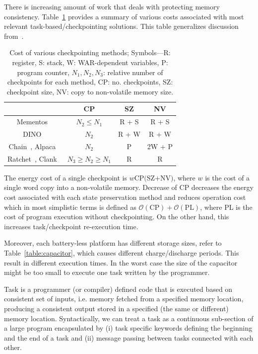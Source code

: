 There is increasing amount of work that deals with protecting memory consistency. Table~\ref{table:chechpoint_comparison} provides a summary of various costs associated with most relevant task-based/checkpointing solutions. This table generalizes discussion from~\cite[Sec. 2.4]{alpaca}.

\begin{table}
	\centering
	\begin{tabular}{|c|c|c|c|}
		\hline
		{~} & CP & SZ & NV \\
		\hline\hline
		\!\!Mementos~\cite{mementos}\!\! & \!\!$N_2\leq N_1$\!\! & \!\!R + S\!\! & \!\!R + S\!\! \\
		\!\!DINO~\cite{dino}\!\! & $N_2$\!\! & \!\!R + W\!\! & \!\!R + W\!\! \\
		\!\!Chain~\cite{chain}, Alpaca~\cite{alpaca}\!\! & \!\!$N_2$\!\! & P\!\! & \!\!2W + P\!\!\\
		\!\!Ratchet~\cite{ratchet}, Clank~\cite{hicks_isca_2017}\!\! & $N_3\geq N_2\geq N_1$\!\! & \!\!R\!\! & R\!\!\\
		\hline 
	\end{tabular}
	\caption{Cost of various checkpointing methods; Symbols---R: register, S: stack, W: WAR-dependent variables, P: program counter, $N_1, N_2, N_3$: relative number of checkpoints for each method, CP: no. checkpoints, SZ: checkpoint size, NV: copy to non-volatile memory size.}
	\label{table:chechpoint_comparison}
\end{table}

The energy cost of a single checkpoint is $w\text{CP(SZ+NV)}$, where $w$ is the cost of a single word copy into a non-volatile memory. Decrease of CP decreases the energy cost associated with each state preservation method and reduces operation cost which in most simplistic terms is defined as $\mathcal{O}(\text{CP})+\mathcal{O}(\text{PL})$, where PL is the cost of program execution without checkpointing. On the other hand, this increases task/checkpoint re-execution time. 

Moreover, each battery-less platform has different storage sizes, refer to Table~\ref{table:capacitor}, which causes different charge/discharge periods. This result in different execution times. In the worst case the size of the capacitor might be too small to execute one task written by the programmer.


Task is a programmer (or compiler) defined code that is executed based on consistent set of inputs, i.e. memory fetched from a specified memory location, producing a consistent output stored in a specified (the same or different) memory location. Syntactically, we can treat a task as a continuous sub-section of a large program encapsulated by (i) task specific keywords defining the beginning and the end of a task and (ii) message passing between tasks connected with each other.


